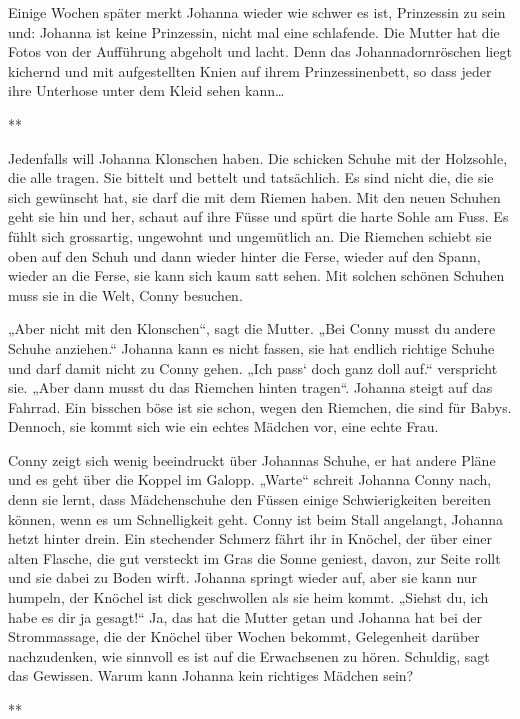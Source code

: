\documentclass[10pt,a5paper]{book}
\newcommand{\sterne}{\par{\centering ***\par}}
\begin{document}
Einige Wochen später merkt Johanna wieder wie schwer es ist, Prinzessin zu sein und: Johanna ist keine Prinzessin, nicht mal eine schlafende. Die Mutter hat die Fotos von der Aufführung abgeholt und lacht. Denn das Johannadornröschen liegt kichernd und mit aufgestellten Knien auf ihrem Prinzessinenbett, so dass jeder ihre Unterhose unter dem Kleid sehen kann\dots


\sterne


Jedenfalls will Johanna Klonschen haben. Die schicken Schuhe mit der Holzsohle, die alle tragen. Sie bittelt und bettelt und tatsächlich. Es sind nicht die, die sie sich gewünscht hat, sie darf die mit dem Riemen haben. Mit den neuen Schuhen geht sie hin und her, schaut auf ihre Füsse und spürt die harte Sohle am Fuss. Es fühlt sich grossartig, ungewohnt und ungemütlich an. Die Riemchen schiebt sie oben auf den Schuh und dann wieder hinter die Ferse, wieder auf den Spann, wieder an die Ferse, sie kann sich kaum satt sehen. Mit solchen schönen Schuhen muss sie in die Welt, Conny besuchen.

 „Aber nicht mit den Klonschen“, sagt die Mutter. „Bei Conny musst du andere Schuhe anziehen.“ Johanna kann es nicht fassen, sie hat endlich richtige Schuhe und darf damit nicht zu Conny gehen. „Ich pass` doch ganz doll auf.“ verspricht sie. „Aber dann musst du das Riemchen hinten tragen“. Johanna steigt auf das Fahrrad. Ein bisschen böse ist sie schon, wegen den Riemchen, die sind für Babys.  Dennoch,  sie kommt sich wie ein echtes Mädchen vor, eine echte Frau. 
 
Conny zeigt sich wenig beeindruckt über Johannas Schuhe, er hat andere Pläne und es geht über die Koppel im Galopp. „Warte“ schreit Johanna Conny nach, denn sie lernt, dass  Mädchenschuhe den Füssen einige Schwierigkeiten bereiten können, wenn es um Schnelligkeit geht. Conny ist beim Stall angelangt, Johanna hetzt hinter drein. Ein stechender Schmerz fährt ihr in Knöchel, der über einer alten Flasche, die gut versteckt im Gras die Sonne geniest, davon, zur Seite rollt und sie dabei zu Boden wirft. Johanna springt wieder auf, aber sie kann nur humpeln, der Knöchel ist dick geschwollen als sie heim kommt. „Siehst du, ich habe es dir ja gesagt!“ Ja, das hat die Mutter getan und Johanna hat bei der Strommassage, die der Knöchel über Wochen bekommt, Gelegenheit darüber nachzudenken, wie sinnvoll es ist auf die Erwachsenen zu hören. Schuldig, sagt das Gewissen. Warum kann Johanna kein richtiges Mädchen sein?


\sterne
\end{document}
